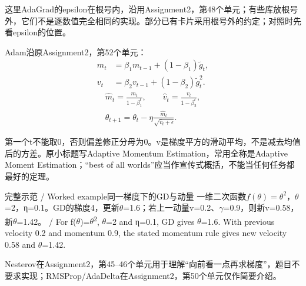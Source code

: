 这里AdaGrad的epsilon在根号内，沿用Assignment2，第48个单元；有些库放根号外，它们不是逐数值完全相同的实现。部分已有卡片采用根号外的约定；对照时先看epsilon的位置。


Adam沿原Assignment2，第52个单元：
\[
\begin{aligned}m_t&=\beta_1m_{t-1}+(1-\beta_1)\tilde g_t,\\
v_t&=\beta_2v_{t-1}+(1-\beta_2)\tilde g_t^2.\end{aligned}\tag{A2.7}
\]
\[
\begin{gathered}\hat m_t=\frac{m_t}{1-\beta_1^t},\qquad\hat v_t=\frac{v_t}{1-\beta_2^t},\\[4pt]
\theta_{t+1}=\theta_t-\eta\frac{\hat m_t}{\sqrt{\hat v_t+\epsilon}}.\end{gathered}\tag{A2.8}
\]


第一个t不能取0，否则偏差修正分母为0。v是梯度平方的滑动平均，不是减去均值后的方差。原小标题写Adaptive Momentum Estimation，常用全称是Adaptive Moment Estimation；“best of all worlds”应当作宣传式概括，不能当任何任务都最好的定理。


\begin{StudyBlock}{完整示范 / Worked example}{同一梯度下的GD与动量}
一维二次函数\(f(\theta)=\theta^2\)，\ensuremath{\theta}=2，η=0.1。GD的梯度4，更新\ensuremath{\theta}=1.6；若上一动量v=0.2、\ensuremath{\gamma}=0.9，则新v=0.58，新\ensuremath{\theta}=1.42。 / For f(\ensuremath{\theta})=\ensuremath{\theta}\textsuperscript{2}, \ensuremath{\theta}=2 and η=0.1, GD gives \ensuremath{\theta}=1.6. With previous velocity 0.2 and momentum 0.9, the stated momentum rule gives new velocity 0.58 and \ensuremath{\theta}=1.42.
\end{StudyBlock}


Nesterov在Assignment2，第45–46个单元用于理解“向前看一点再求梯度”，题目不要求实现；RMSProp/AdaDelta在Assignment2，第50个单元仅作简要介绍。








